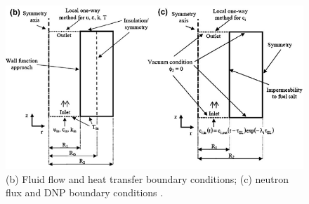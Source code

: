 \documentclass{article}
\begin{document}
\begin{figure}[htpb]
  \centering
  \includegraphics[max height=.5\textheight,max width=\textwidth,keepaspectratio]{Cammi_simplification_2.png}
  \caption{(b) Fluid flow and heat transfer boundary conditions; (c) neutron 
        flux and DNP boundary conditions \cite{cammi_multi-physics_2011}.}
  \label{fig:simlification-2}
\end{figure}

\FloatBarrier



\end{document}
